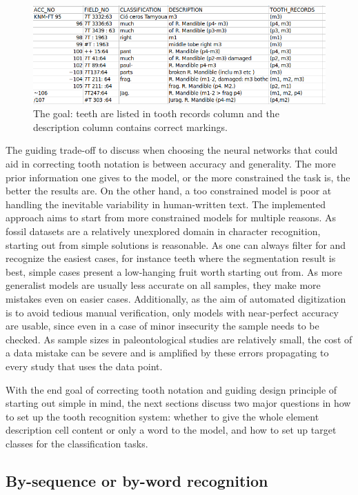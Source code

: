 \documentclass[english,twoside,openright]{UH_DS_MSc}
\begin{document}
\begin{figure}[ht]
    \centering
    \includegraphics*[scale=0.5]{images/goal.png}
    \caption{The goal: teeth are listed in tooth records column and the description column contains correct markings.}
    \label{image:goal}
\end{figure}

The guiding trade-off to discuss when choosing the neural networks that could aid in correcting
tooth notation is between accuracy and generality. The more prior information one gives to 
the model, or the more constrained the task is, the better the results are. On the other hand, a too
constrained model is poor at handling the inevitable variability in human-written text.
The implemented approach aims to start from more constrained models for multiple reasons. 
As fossil datasets are a relatively unexplored domain in character recognition, starting out from simple
solutions is reasonable. As one can always filter for and recognize the easiest 
cases, for instance teeth where the segmentation result is best,
simple cases present a low-hanging fruit worth starting out from. As more generalist 
models are usually less accurate on all samples, they make more mistakes even on
easier cases. Additionally, as the aim of automated digitization is to avoid tedious manual verification,
 only models with near-perfect accuracy are usable, since even in a case of minor insecurity the sample needs to be checked.
As sample sizes in paleontological studies are relatively small, the cost of a data mistake
can be severe and is amplified by these errors propagating to every study that uses the data point.

With the end goal of correcting tooth notation and guiding design principle of starting out simple in mind, the next sections discuss two major questions 
in how to set up the tooth recognition system: whether to give the whole element description cell content
 or only a word to the model, and how to set up target classes for the classification tasks.

\subsection{By-sequence or by-word recognition}
\end{document}
